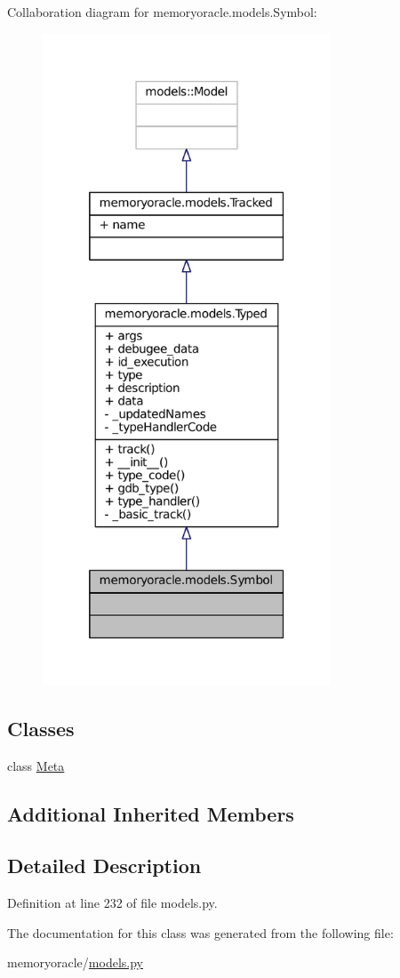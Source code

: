 Collaboration diagram for memoryoracle.\+models.\+Symbol\+:\nopagebreak
\begin{figure}[H]
\begin{center}
\leavevmode
\includegraphics[height=550pt]{classmemoryoracle_1_1models_1_1Symbol__coll__graph}
\end{center}
\end{figure}
\subsection*{Classes}
\begin{DoxyCompactItemize}
\item 
class \hyperlink{classmemoryoracle_1_1models_1_1Symbol_1_1Meta}{Meta}
\end{DoxyCompactItemize}
\subsection*{Additional Inherited Members}


\subsection{Detailed Description}


Definition at line 232 of file models.\+py.



The documentation for this class was generated from the following file\+:\begin{DoxyCompactItemize}
\item 
memoryoracle/\hyperlink{models_8py}{models.\+py}\end{DoxyCompactItemize}
